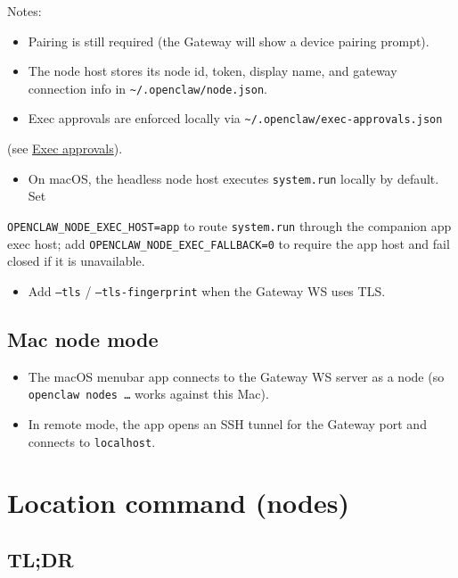 Notes:

\begin{itemize}
  \item Pairing is still required (the Gateway will show a device pairing prompt).
  \item The node host stores its node id, token, display name, and gateway connection info in \texttt{\textasciitilde{}/.openclaw/node.json}.
  \item Exec approvals are enforced locally via \texttt{\textasciitilde{}/.openclaw/exec-approvals.json}
\end{itemize}

(see \href{/tools/exec-approvals}{Exec approvals}).
\begin{itemize}
  \item On macOS, the headless node host executes \texttt{system.run} locally by default. Set
\end{itemize}

\texttt{OPENCLAW\_NODE\_EXEC\_HOST=app} to route \texttt{system.run} through the companion app exec host; add
\texttt{OPENCLAW\_NODE\_EXEC\_FALLBACK=0} to require the app host and fail closed if it is unavailable.
\begin{itemize}
  \item Add \texttt{--tls} / \texttt{--tls-fingerprint} when the Gateway WS uses TLS.
\end{itemize}


\subsection{Mac node mode}


\begin{itemize}
  \item The macOS menubar app connects to the Gateway WS server as a node (so \texttt{openclaw nodes …} works against this Mac).
  \item In remote mode, the app opens an SSH tunnel for the Gateway port and connects to \texttt{localhost}.
\end{itemize}



\clearpage

\section{Location command (nodes)}


\subsection{TL;DR}


